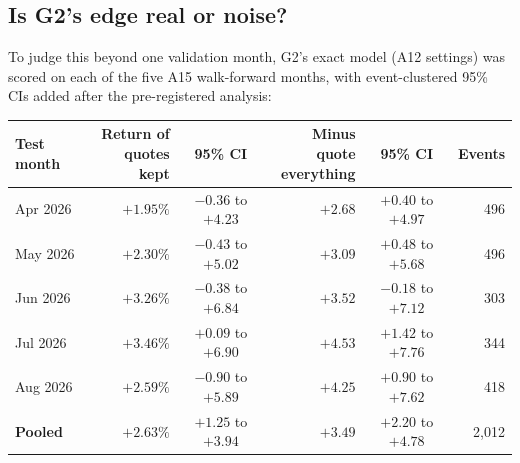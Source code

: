 \documentclass[11pt,a4paper]{article}
\begin{document}
\subsection{Is G2's edge real or noise?}\label{sec:noise}
To judge this beyond one validation month, G2's exact model (A12 settings) was scored on each of the five A15
walk-forward months, with event-clustered 95\% CIs added after the pre-registered analysis:

\begin{center}
\small
\begin{tabular}{l r c r c r}
\toprule
Test month & \shortstack[r]{Return of\\quotes kept} & 95\% CI & \shortstack[r]{Minus quote\\everything} & 95\% CI & Events \\
\midrule
Apr 2026 & $+1.95\%$ & $-0.36$ to $+4.23$ & $+2.68$ & $+0.40$ to $+4.97$ & 496 \\
May 2026 & $+2.30\%$ & $-0.43$ to $+5.02$ & $+3.09$ & $+0.48$ to $+5.68$ & 496 \\
Jun 2026 & $+3.26\%$ & $-0.38$ to $+6.84$ & $+3.52$ & $-0.18$ to $+7.12$ & 303 \\
Jul 2026 & $+3.46\%$ & $+0.09$ to $+6.90$ & $+4.53$ & $+1.42$ to $+7.76$ & 344 \\
Aug 2026 & $+2.59\%$ & $-0.90$ to $+5.89$ & $+4.25$ & $+0.90$ to $+7.62$ & 418 \\
\midrule
\textbf{Pooled} & $\mathbf{+2.63\%}$ & $+1.25$ to $+3.94$ & $\mathbf{+3.49}$ & $+2.20$ to $+4.78$ & 2,012 \\
\bottomrule
\end{tabular}
\end{center}
\end{document}
